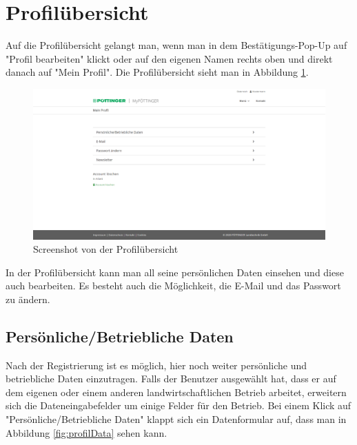 \section{Profilübersicht}

Auf die Profilübersicht gelangt man, wenn man in dem Bestätigungs-Pop-Up auf "Profil bearbeiten" klickt oder auf den eigenen Namen rechts oben und direkt danach auf "Mein Profil". Die Profilübersicht sieht man in Abbildung \ref{fig:profil}.

\begin{figure}[H]
	\centerline{
		\includegraphics[width=1\textwidth, frame]{./grafiken/erm_profil.png}
	}
	\vskip0pt
	\caption{Screenshot von der Profilübersicht} \label{fig:profil}
\end{figure}
\newpage
In der Profilübersicht kann man all seine persönlichen Daten einsehen und diese auch bearbeiten. Es besteht auch die Möglichkeit, die E-Mail und das Passwort zu ändern.

\subsection{Persönliche/Betriebliche Daten}

Nach der Registrierung ist es möglich, hier noch weiter persönliche und betriebliche Daten einzutragen. Falls der Benutzer ausgewählt hat, dass er auf dem eigenen oder einem anderen landwirtschaftlichen Betrieb arbeitet, erweitern sich die Dateneingabefelder um einige Felder für den Betrieb. Bei einem Klick auf "Persönliche/Betriebliche Daten" klappt sich ein Datenformular auf, dass man in Abbildung \ref{fig:profilData} sehen kann.

